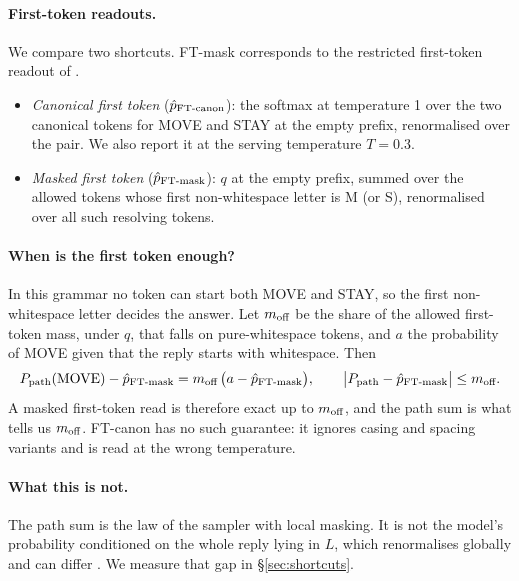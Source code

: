 \paragraph{First-token readouts.}
We compare two shortcuts. FT-mask corresponds to the restricted first-token readout of \citet{ahnert2026survey}.
\begin{itemize}[leftmargin=*,itemsep=2pt]
  \item \emph{Canonical first token} ($\hat p_{\text{FT-canon}}$): the softmax at temperature 1 over the two canonical tokens for MOVE and STAY at the empty prefix, renormalised over the pair. We also report it at the serving temperature $T=0.3$.
  \item \emph{Masked first token} ($\hat p_{\text{FT-mask}}$): $q$ at the empty prefix, summed over the allowed tokens whose first non-whitespace letter is M (or S), renormalised over all such resolving tokens.
\end{itemize}

\paragraph{When is the first token enough?}
In this grammar no token can start both MOVE and STAY, so the first non-whitespace letter decides the answer.
Let $m_{\text{off}}$ be the share of the allowed first-token mass, under $q$, that falls on pure-whitespace tokens, and $a$ the probability of MOVE given that the reply starts with whitespace. Then
\begin{equation}
P_{\text{path}}(\text{MOVE})-\hat p_{\text{FT-mask}}=m_{\text{off}}\,\big(a-\hat p_{\text{FT-mask}}\big),\qquad
\big|P_{\text{path}}-\hat p_{\text{FT-mask}}\big|\le m_{\text{off}} .
\end{equation}
A masked first-token read is therefore exact up to $m_{\text{off}}$, and the path sum is what tells us $m_{\text{off}}$.
FT-canon has no such guarantee: it ignores casing and spacing variants and is read at the wrong temperature.

\paragraph{What this is not.}
The path sum is the law of the sampler with local masking.
It is not the model's probability conditioned on the whole reply lying in $L$, which renormalises globally and can differ \citep{park2024grammar}.
We measure that gap in \S\ref{sec:shortcuts}.

